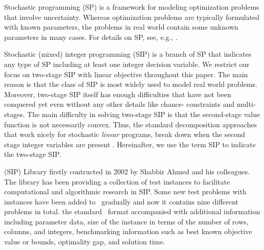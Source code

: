 Stochastic programming (SP) is a framework for modeling optimization problems that involve 
uncertainty. Whereas optimization problems are typically formulated with known parameters, 
the problems in real world contain some unknown parameters in many cases. For details on SP, 
see, e.g., \cite{web:SPS,book:BL2011}. 

Stochastic (mixed) integer programming (SIP) is a branch of SP that indicates any type of SP 
including at least one integer decision variable. We restrict our focus on two-stage SIP with 
linear objective throughout this paper. The main reason is that the class of SIP is most 
widely used to model real world problems. Moreover, two-stage SIP itself has enough 
difficulties that have not been conquered yet even without any other details like chance-
constraints and multi-stages. The main difficulty in solving two-stage SIP is that the 
second-stage value function is not necessarily convex. Thus, the standard decomposition 
approaches that work nicely for stochastic \textit{linear} programs, break down when the 
second stage integer variables are present \cite{journal:AG2004}. Hereinafter, we use the 
term SIP to indicate the two-stage SIP. 


(SIP) Library firstly contructed in 2002 by Shabbir Ahmed and his colleagues. The library has 
been providing a collection of test instances to facilitate computational and algorithmic 
research in SIP. Some new test problems with instances have been added to \siplib\ gradually 
and now it contains nine different problems in total. %
the standard \smps\ format accompanied with additional information including parameter data, 
size of the instance in terms of the number of rows, columns, and integers, benchmarking 
information such as best known objective value or bounds, optimality gap, and solution time. 




